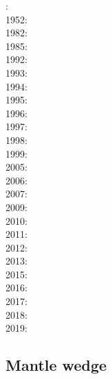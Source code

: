 {\scriptsize
{}: \cite{wiad23}\\
1952: \cite{birc52}\\
1982: \cite{yusb82}\cite{chri82}\\
1985: \cite{chyu85}\\
1992: \cite{zhyh92}\\
1993: \cite{tasg93}\cite{best93}\cite{kief93}\cite{styz93}\\
1994: \cite{vayv94}\cite{zhgu94b}\cite{styu94}\\
1995: \cite{zhyu95}\cite{chri95}\cite{scta95}\cite{tack95}\\
1996: \cite{pelt96}\cite{mitr96}\cite{tack96b}\\
1997: \cite{mifo97}\cite{pebs97}\\
1998: \cite{cava98}\cite{kenn98}\\
1999: \cite{sigh99}\cite{kehv99}\cite{vaka99}\\
2005: \cite{hett05}\cite{nata05b}\cite{nabu05}\cite{stli05}\cite{stli05b}\\
2006: \cite{javd06}\cite{stca06}\\
2007: \cite{pazw07}\cite{mofm07}\cite{tanh07}\cite{stli07}\cite{lioh07}\cite{jade07}\cite{pisb07}\\
2009: \cite{natd09}\\
2010: \cite{kayy10}\\
2011: \cite{java11}\cite{faff11}\cite{nata11}\cite{vayj11}\cite{stli11}\\
2012: \cite{tack12}\cite{sato12}\cite{natd12}\cite{stli12}\\
2013: \cite{fakc13}\cite{taab13}\cite{jasv13}\\
2015: \cite{basn15}\cite{glfa15}\cite{amsb15}\\
2016: \cite{tiro16}\cite{beci16}\\
2017: \cite{vavs17}\cite{jasv17}\\
2018: \cite{mazh18}\\
2019: \cite{jasv19}
}

\subsection{Mantle wedge} 

